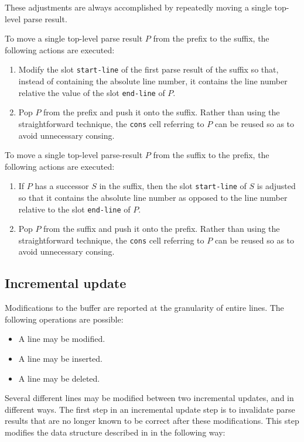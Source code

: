 These adjustments are always accomplished by repeatedly moving a
single top-level parse result.

To move a single top-level parse result $P$ from the prefix to the
suffix, the following actions are executed:

\begin{enumerate}
\item Modify the slot \texttt{start-line} of the first parse result of
  the suffix so that, instead of containing the absolute line number,
  it contains the line number relative the value of the slot
  \texttt{end-line} of $P$.
\item Pop $P$ from the prefix and push it onto the suffix.  Rather
  than using the straightforward technique, the \texttt{cons} cell
  referring to $P$ can be reused so as to avoid unnecessary consing.
\end{enumerate}

To move a single top-level parse-result $P$ from the suffix to the
prefix, the following actions are executed:

\begin{enumerate}
\item If $P$ has a successor $S$ in the suffix, then the slot
  \texttt{start-line} of $S$ is adjusted so that it contains the
  absolute line number as opposed to the line number relative to the
  slot \texttt{end-line} of $P$.
\item Pop $P$ from the suffix and push it onto the prefix.  Rather
  than using the straightforward technique, the \texttt{cons} cell
  referring to $P$ can be reused so as to avoid unnecessary consing.
\end{enumerate}

\subsection{Incremental update}

Modifications to the buffer are reported at the granularity of entire
lines.  The following operations are possible:

\begin{itemize}
\item A line may be modified.
\item A line may be inserted.
\item A line may be deleted.
\end{itemize}

Several different lines may be modified between two incremental
updates, and in different ways.  The first step in an incremental
update step is to invalidate parse results that are no longer known to
be correct after these modifications.  This step modifies the data
structure described in
 in the following
way:

